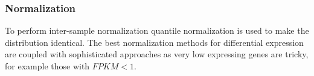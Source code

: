 		\subsubsection{Normalization}
		To perform inter-sample normalization quantile normalization is used to make the distribution identical.
		The best normalization methods for differential expression are coupled with sophisticated approaches as very low expressing genes are tricky, for example those with $FPKM<1$.
